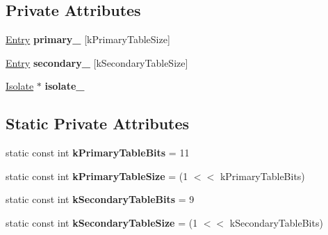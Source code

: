 \subsection*{Private Attributes}
\begin{DoxyCompactItemize}
\item 
\hyperlink{structv8_1_1internal_1_1_stub_cache_1_1_entry}{Entry} {\bfseries primary\+\_\+} \mbox{[}k\+Primary\+Table\+Size\mbox{]}\hypertarget{classv8_1_1internal_1_1_stub_cache_ab8bf2dd09007dc40717d7ee60291d2eb}{}\label{classv8_1_1internal_1_1_stub_cache_ab8bf2dd09007dc40717d7ee60291d2eb}

\item 
\hyperlink{structv8_1_1internal_1_1_stub_cache_1_1_entry}{Entry} {\bfseries secondary\+\_\+} \mbox{[}k\+Secondary\+Table\+Size\mbox{]}\hypertarget{classv8_1_1internal_1_1_stub_cache_a2b8d5ee43540a51d8c3ff007b785a1ea}{}\label{classv8_1_1internal_1_1_stub_cache_a2b8d5ee43540a51d8c3ff007b785a1ea}

\item 
\hyperlink{classv8_1_1internal_1_1_isolate}{Isolate} $\ast$ {\bfseries isolate\+\_\+}\hypertarget{classv8_1_1internal_1_1_stub_cache_a2a26800405e87bd5f0b900036c938517}{}\label{classv8_1_1internal_1_1_stub_cache_a2a26800405e87bd5f0b900036c938517}

\end{DoxyCompactItemize}
\subsection*{Static Private Attributes}
\begin{DoxyCompactItemize}
\item 
static const int {\bfseries k\+Primary\+Table\+Bits} = 11\hypertarget{classv8_1_1internal_1_1_stub_cache_a227170c5270d6466a4f116206a12f879}{}\label{classv8_1_1internal_1_1_stub_cache_a227170c5270d6466a4f116206a12f879}

\item 
static const int {\bfseries k\+Primary\+Table\+Size} = (1 $<$$<$ k\+Primary\+Table\+Bits)\hypertarget{classv8_1_1internal_1_1_stub_cache_aadaf0bfada4516c5918921ed05bdfb74}{}\label{classv8_1_1internal_1_1_stub_cache_aadaf0bfada4516c5918921ed05bdfb74}

\item 
static const int {\bfseries k\+Secondary\+Table\+Bits} = 9\hypertarget{classv8_1_1internal_1_1_stub_cache_a38beaddc959a149be39c0945b839c696}{}\label{classv8_1_1internal_1_1_stub_cache_a38beaddc959a149be39c0945b839c696}

\item 
static const int {\bfseries k\+Secondary\+Table\+Size} = (1 $<$$<$ k\+Secondary\+Table\+Bits)\hypertarget{classv8_1_1internal_1_1_stub_cache_a9166b165aa5c1debb4c3d83923948df8}{}\label{classv8_1_1internal_1_1_stub_cache_a9166b165aa5c1debb4c3d83923948df8}

\end{DoxyCompactItemize}
